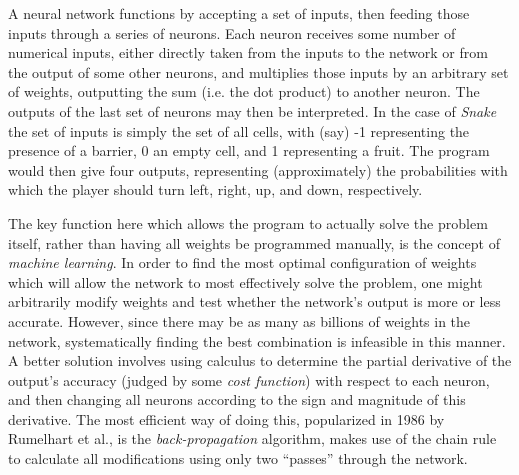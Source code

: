 \documentclass[preprint]{sigplanconf}
\begin{document}
A neural network functions by accepting a set of inputs, then feeding those inputs through a series of neurons. Each neuron receives some number of numerical inputs, either directly taken from the inputs to the network or from the output of some other neurons, and multiplies those inputs by an arbitrary set of weights, outputting the sum (i.e. the dot product) to another neuron. The outputs of the last set of neurons may then be interpreted. In the case of \textit{Snake} the set of inputs is simply the set of all cells, with (say) -1 representing the presence of a barrier, 0 an empty cell, and 1 representing a fruit. The program would then give four outputs, representing (approximately) the probabilities with which the player should turn left, right, up, and down, respectively.

The key function here which allows the program to actually solve the problem itself, rather than having all weights be programmed manually, is the concept of \textit{machine learning}. In order to find the most optimal configuration of weights which will allow the network to most effectively solve the problem, one might arbitrarily modify weights and test whether the network's output is more or less accurate. However, since there may be as many as billions of weights in the network, systematically finding the best combination is infeasible in this manner. A better solution involves using calculus to determine the partial derivative of the output's accuracy (judged by some \textit{cost function}) with respect to each neuron, and then changing all neurons according to the sign and magnitude of this derivative. The most efficient way of doing this, popularized in 1986 by Rumelhart et al., is the \textit{back-propagation} algorithm, makes use of the chain rule to calculate all modifications using only two ``passes'' through the network.
\end{document}
